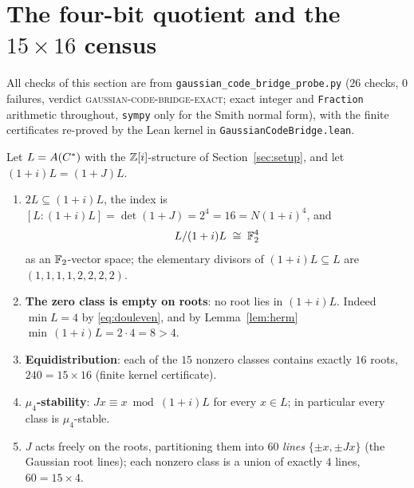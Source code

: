 \section{The four-bit quotient and the
\texorpdfstring{$15\times16$}{15 x 16} census}\label{sec:census}

All checks of this section are from
\texttt{gaussian\_code\_bridge\_probe.py} ($26$ checks, $0$ failures,
verdict \textsc{gaussian-code-bridge-exact}; exact integer and
\texttt{Fraction} arithmetic throughout, \texttt{sympy} only for the
Smith normal form), with the finite certificates re-proved by the
Lean kernel in \texttt{GaussianCodeBridge.lean}.

\begin{theorem}
\label{thm:census}
Let $L=A(C^{*})$ with the $\mathbb Z[i]$-structure of
Section~\ref{sec:setup}, and let $(1+i)L=(1+J)L$.
\begin{enumerate}
\item[(i)] $2L\subseteq(1+i)L$, the index is
$[L:(1+i)L]=\det(1+J)=2^4=16=N(1+i)^4$, and
\[
L/(1+i)L\;\cong\;\mathbb F_2^4
\]
as an $\mathbb F_2$-vector space; the elementary divisors of
$(1+i)L\subseteq L$ are $(1,1,1,1,2,2,2,2)$.
\item[(ii)] \textbf{The zero class is empty on roots}: no root lies
in $(1+i)L$.  Indeed $\min L=4$ by \eqref{eq:douleven}, and by
Lemma~\ref{lem:herm} $\min\,(1+i)L=2\cdot4=8>4$.
\item[(iii)] \textbf{Equidistribution}: each of the $15$ nonzero
classes contains exactly $16$ roots, $240=15\times16$
(finite kernel certificate).
\item[(iv)] \textbf{$\mu_4$-stability}: $Jx\equiv x \bmod (1+i)L$ for
every $x\in L$; in particular every class is $\mu_4$-stable.
\item[(v)] $J$ acts freely on the roots, partitioning them into $60$
\emph{lines} $\{\pm x,\pm Jx\}$ (the Gaussian root lines); each
nonzero class is a union of exactly $4$ lines, $60=15\times4$.
\end{enumerate}
\end{theorem}

